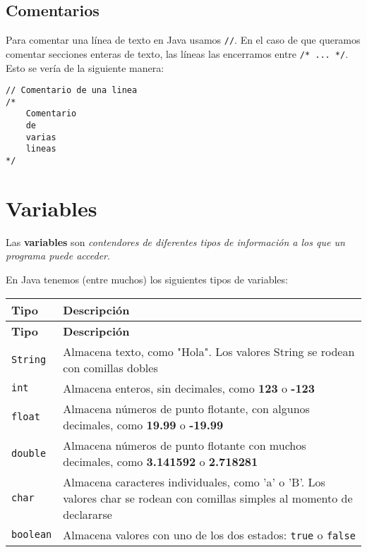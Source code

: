 \documentclass[12pt]{article}
\theoremstyle{largebreak}
\begin{document}
    \subsection{Comentarios}

    Para comentar una línea de texto en Java usamos \lstinline|//|. En el caso de que queramos comentar secciones enteras de texto, las líneas las encerramos entre \lstinline|/* ... */|. Esto se vería de la siguiente manera:

    \begin{lstlisting}[caption={Comentarios.},label=DescriptiveLabel]
// Comentario de una linea
/*
    Comentario
    de
    varias
    lineas
*/
    \end{lstlisting}

    \section{Variables}

    \begin{mydef}
        Las \textbf{variables} son \textit{contendores de diferentes tipos de información a los que un programa puede acceder}.
    \end{mydef}

    En Java tenemos (entre muchos) los siguientes tipos de variables:

    \begin{longtable}{l p{}}
    \toprule
    \textbf{Tipo} & \textbf{Descripción} \\
    \midrule
    \endfirsthead

    \midrule
    \textbf{Tipo} & \textbf{Descripción} \\
    \midrule
    \endhead

    \bottomrule
    \endfoot

    \lstinline|String| & Almacena texto, como "Hola". Los valores String se rodean con comillas dobles \\
    \lstinline|int| & Almacena enteros, sin decimales, como \textbf{123} o \textbf{-123} \\
    \lstinline|float| & Almacena números de punto flotante, con algunos decimales, como \textbf{19.99} o \textbf{-19.99} \\
    \lstinline|double| & Almacena números de punto flotante con muchos decimales, como \textbf{3.141592} o \textbf{2.718281} \\
    \lstinline|char| & Almacena caracteres individuales, como 'a' o 'B'. Los valores char se rodean con comillas simples al momento de declararse \\
    \lstinline|boolean| & Almacena valores con uno de los dos estados: \lstinline|true| o \lstinline|false| \\
    \hline
    \end{longtable}
\end{document}
